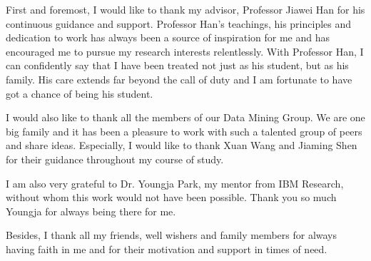 First and foremost, I would like to thank my advisor, Professor Jiawei Han for his continuous guidance and support. Professor Han's teachings, his principles and dedication to work has always been a source of inspiration for me and has encouraged me to pursue my research interests relentlessly. With Professor Han, I can confidently say that I have been treated not just as his student, but as his family. His care extends far beyond the call of duty and I am fortunate to have got a chance of being his student.

I would also like to thank all the members of our Data Mining Group. We are one big family and it has been a pleasure to work with such a talented group of peers and share ideas. Especially, I would like to thank Xuan Wang and Jiaming Shen for their guidance throughout my course of study.

I am also very grateful to Dr. Youngja Park, my mentor from IBM Research, without whom this work would not have been possible. Thank you so much Youngja for always being there for me.

Besides, I thank all my friends, well wishers and family members for always having faith in me and for their motivation and support in times of need.
